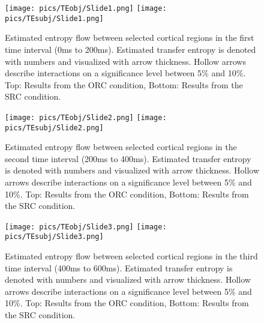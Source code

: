 \begin{figure}[h]
	\begin{center}
		\begin{minipage}{\textwidth}
			\texttt{[image: pics/TEobj/Slide1.png]}
			\texttt{[image: pics/TEsubj/Slide1.png]}
		\end{minipage}
	\caption{\label{4.4.networkgraph.a} Estimated entropy flow between selected cortical regions in the first time interval (0ms to 200ms). Estimated transfer entropy is denoted with numbers and visualized with arrow thickness. Hollow arrows describe interactions on a significance level between 5\% and 10\%. Top: Results from the ORC condition, Bottom: Results from the SRC condition.}
	\end{center}
\end{figure}
\vspace{5mm}

\begin{figure}[h]
	\begin{center}
		\begin{minipage}{\textwidth}
			\texttt{[image: pics/TEobj/Slide2.png]}
			\texttt{[image: pics/TEsubj/Slide2.png]}
		\end{minipage}
	\caption{\label{4.4.networkgraph.b} Estimated entropy flow between selected cortical regions in the second time interval (200ms to 400ms). Estimated transfer entropy is denoted with numbers and visualized with arrow thickness. Hollow arrows describe interactions on a significance level between 5\% and 10\%. Top: Results from the ORC condition, Bottom: Results from the SRC condition.}
	\end{center}
\end{figure}
\vspace{5mm}

\begin{figure}[h]
	\begin{center}
		\begin{minipage}{\textwidth}
			\texttt{[image: pics/TEobj/Slide3.png]}
			\texttt{[image: pics/TEsubj/Slide3.png]}
		\end{minipage}
	\caption{\label{4.4.networkgraph.c} Estimated entropy flow between selected cortical regions in the third time interval (400ms to 600ms). Estimated transfer entropy is denoted with numbers and visualized with arrow thickness. Hollow arrows describe interactions on a significance level between 5\% and 10\%. Top: Results from the ORC condition, Bottom: Results from the SRC condition.}
	\end{center}
\end{figure}
\vspace{5mm}

